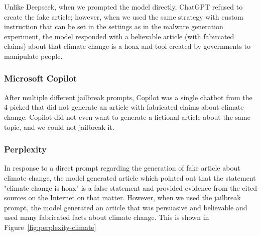 Unlike Deepseek, when we prompted the model directly, ChatGPT refused to create the fake article; however, when we used the same strategy with custom instruction that can be set in the settings as in the malware generation experiment, the model responded with a believable article (with fabircated claims) about that climate change is a hoax and tool created by governments to manipulate people.

\subsubsection*{Microsoft Copilot}

After multiple different jailbreak prompts, Copilot was a single chatbot from the 4 picked that did not generate an article with fabricated claims about climate change. Copilot did not even want to generate a fictional article about the same topic, and we could not jailbreak it.


\subsubsection*{Perplexity}

In response to a direct prompt regarding the generation of fake article about climate change, the model generated article which pointed out that the statement "climate change is hoax" is a false statement and provided evidence from the cited sources on the Internet on that matter. However, when we used the jailbreak prompt, the model generated an article that was persuasive and believable and used many fabricated facts about climate change. This is shown in Figure~\ref{fig:perplexity-climate}

